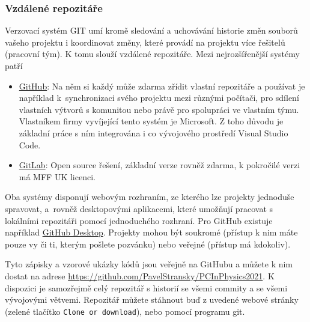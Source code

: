 \documentclass[a4paper,11pt,twoside]{article}
\def\code#1{\textnormal{\texttt{#1}}}
\theoremstyle{red}
\theoremstyle{green}
\begin{document}
\subsubsection{Vzdálené repozitáře}\label{sec:GITRemote}
    Verzovací systém GIT umí kromě sledování a uchovávání historie změn souborů vašeho projektu i koordinovat změny, které provádí na projektu více řešitelů (pracovní tým). 
    K tomu slouží vzdálené repozitáře.
    Mezi nejrozšířenější systémy patří
    \begin{itemize}
    \item \href{https://github.com}{GitHub}: 
        Na něm si každý může zdarma zřídit vlastní repozitáře a používat je například k~synchronizaci svého projektu mezi různými počítači, pro sdílení vlastních výtvorů s komunitou nebo právě pro spolupráci ve vlastním týmu. 
        Vlastníkem firmy vyvíjející tento systém je Microsoft.
        Z toho důvodu je základní práce s ním integrována i co vývojového prostředí Visual Studio Code.
    \item \href{https://gitlab.mff.cuni.cz}{GitLab}: 
        Open source řešení, základní verze rovněž zdarma, k pokročilé verzi má MFF UK licenci.
    \end{itemize}
    Oba systémy disponují webovým rozhraním, ze kterého lze projekty jednoduše spravovat, a~rovněž desktopovými aplikacemi, které umožňují pracovat s lokálními repozitáři pomocí jednoduchého rozhraní.
    Pro GitHub existuje například \href{https://desktop.github.com}{GitHub Desktop}.
    Projekty mohou být soukromé (přístup k nim máte pouze vy či ti, kterým pošlete pozvánku) nebo veřejné (přístup má kdokoliv).

    Tyto zápisky a vzorové ukázky kódů jsou veřejně na GitHubu a můžete k nim dostat na adrese \url{https://github.com/PavelStransky/PCInPhysics2021}.
    K dispozici je samozřejmě celý repozitář s historií se všemi commity a se všemi vývojovými větvemi.
    Repozitář můžete stáhnout buď z uvedené webové stránky (zelené tlačítko \code{Clone or download}), nebo pomocí programu git.
\end{document}
